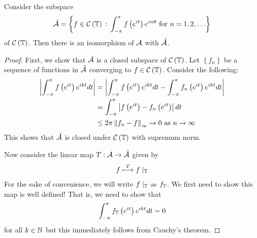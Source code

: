 \begin{theorem}
    Consider the subspace
    \begin{align*}
	\tilde{{\cal A}} = \left\{ f\in {\cal C} \left( \mathbb T \right) \, : \, \int_{-\pi}^{\pi} f\left( e^{it} \right) e^{in\theta}  \text{ for } n=1,2,\ldots \right\}
    \end{align*}
    of ${\cal C} \left( \mathbb T \right)$. Then there is an isomorphism of ${\cal A}$ with $\tilde{{\cal A}}$.
    \label{thm:correspondence-of-disc-algebra}
\end{theorem}
\begin{proof}
    First, we show that $\tilde{{\cal A}}$ is a closed subspace of ${\cal C} \left( \mathbb T \right)$. Let $\left\{ f_{n} \right\}$ be a sequence of functions in $\tilde{{\cal A}}$ converging to $f\in {\cal C} \left( \mathbb T \right)$. Consider the following:
    \begin{align*}
	\left\lvert \int_{-\pi}^{\pi} f\left( e^{it} \right) e^{ikt} dt \right\rvert &= \left\lvert \int_{-\pi}^{\pi} f\left( e^{it} \right) e^{ikt} dt - \int_{-\pi}^{\pi} f_n\left( e^{it} \right) e^{ikt} dt \right\rvert  \\
	&= \int_{-\pi}^{\pi} \left\lvert f \left( e^{it} \right) -f_{n} \left( e^{it} \right) \right\rvert dt \\
	& \le 2\pi \left\lVert f_{n} - f \right\rVert_{\infty} \to 0 \text{ as } n\to \infty
    \end{align*}
    This shows that $\tilde{{\cal A}}$ is closed under ${\cal C} \left( \mathbb T \right)$ with supremum norm.

    Now consider the linear map $T: {\cal A} \to \tilde{{\cal A}}$ given by
    \begin{align*}
	f \stackrel{T}{\longmapsto} f\mid_{\mathbb T}
    \end{align*}
    For the sake of convenience, we will write $f\mid_{\mathbb T}$ as $f_{\mathbb T}$.
    We first need to show this map is well defined! That is, we need to show that
    \begin{equation*}
	\int_{-\pi}^{\pi} f_{\mathbb T} \left( e^{it} \right) e^{ikt} dt = 0	
    \end{equation*}
    for all $k\in \mathbb N$ but this immediately follows from Cauchy's theorem.


\end{proof}
